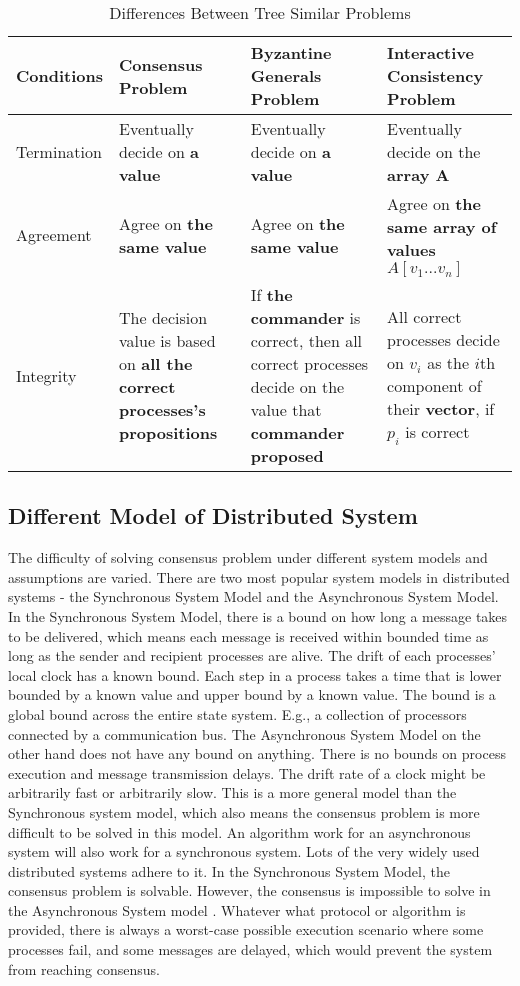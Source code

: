 \documentclass[12pt, a4paper]{article}
\begin{document}
\begin{table}[htp]
\centering
\begin{tabular}{|l|p{3.5cm}|p{3.5cm}|p{3.5cm}|}
\hline
Conditions  & Consensus Problem & Byzantine Generals Problem& Interactive Consistency Problem \\ \hline
Termination & Eventually decide on \textbf{a value} & Eventually decide on \textbf{a value} & Eventually decide on the \textbf{array A} \\ \hline
Agreement   & Agree on \textbf{the same value} & Agree on \textbf{the same value} & Agree on \textbf{the same array of values $A[v_{1}...v_{n}]$} \\ \hline
Integrity 	& The decision value is based on \textbf{all the correct processes's propositions} &  If \textbf{the commander} is correct, then all correct processes decide on the value that \textbf{commander proposed} & All correct processes decide on $v_{i}$ as the ${i}$th component of their \textbf{vector}, if $p_{i}$ is correct \\ \hline
\end{tabular}
\caption{Differences Between Tree Similar Problems}
\label{tab:dbtap}
\end{table}

\subsection{Different Model of Distributed System}
The difficulty of solving consensus problem under different system models and assumptions are varied. There are two most popular system models in distributed systems - the Synchronous System Model and the Asynchronous System Model. In the Synchronous System Model, there is a bound on how long a message takes to be delivered, which means each message is received within bounded time as long as the sender and recipient processes are alive. The drift of each processes' local clock has a known bound. Each step in a process takes a time that is lower bounded by a known value and upper bound by a known value. The bound is a global bound across the entire state system. E.g., a collection of processors connected by a communication bus. The Asynchronous System Model on the other hand does not have any bound on anything. There is no bounds on process execution and message transmission delays. The drift rate of a clock might be arbitrarily fast or arbitrarily slow. This is a more general model than the Synchronous system model, which also means the consensus problem is more difficult to be solved in this model. An algorithm work for an asynchronous system will also work for a synchronous system. Lots of the very widely used distributed systems adhere to it. In the Synchronous System Model, the consensus problem is solvable. However, the consensus is impossible to solve in the Asynchronous System model \cite{fischer1985impossibility}. Whatever what protocol or algorithm is provided, there is always a worst-case possible execution scenario where some processes fail, and some messages are delayed, which would prevent the system from reaching consensus.
\end{document}
